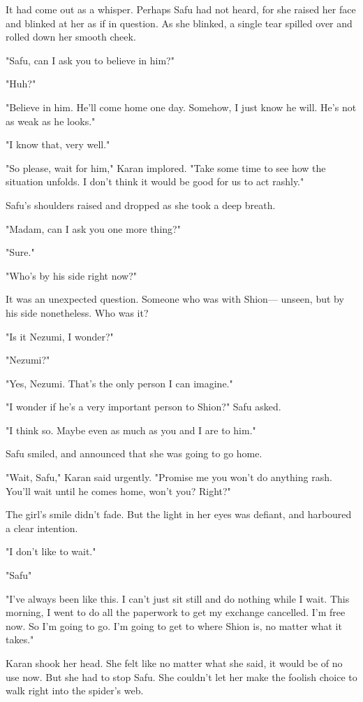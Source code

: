 It had come out as a whisper. Perhaps Safu had not heard, for she raised
her face and blinked at her as if in question. As she blinked, a single
tear spilled over and rolled down her smooth cheek.

"Safu, can I ask you to believe in him?"

"Huh?"

"Believe in him. He'll come home one day. Somehow, I just know he will.
He's not as weak as he looks."

"I know that, very well."

"So please, wait for him," Karan implored. "Take some time to see how
the situation unfolds. I don't think it would be good for us to act
rashly."

Safu's shoulders raised and dropped as she took a deep breath.

"Madam, can I ask you one more thing?"

"Sure."

"Who's by his side right now?"

It was an unexpected question. Someone who was with Shion--- unseen, but
by his side nonetheless. Who was it?

"Is it Nezumi, I wonder?"

"Nezumi?"

"Yes, Nezumi. That's the only person I can imagine."

"I wonder if he's a very important person to Shion?" Safu asked.

"I think so. Maybe even as much as you and I are to him."

Safu smiled, and announced that she was going to go home.

"Wait, Safu," Karan said urgently. "Promise me you won't do anything
rash. You'll wait until he comes home, won't you? Right?"

The girl's smile didn't fade. But the light in her eyes was defiant, and
harboured a clear intention.

"I don't like to wait."

"Safu\el "

"I've always been like this. I can't just sit still and do nothing while
I wait. This morning, I went to do all the paperwork to get my exchange
cancelled. I'm free now. So I'm going to go. I'm going to get to where
Shion is, no matter what it takes."

Karan shook her head. She felt like no matter what she said, it would be
of no use now. But she had to stop Safu. She couldn't let her make the
foolish choice to walk right into the spider's web.

